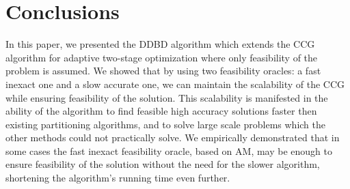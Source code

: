 \documentclass[12pt,x11names]{article}
\theoremstyle{definition}
\begin{document}
\section{Conclusions}
In this paper, we presented the DDBD algorithm which extends the CCG algorithm for adaptive two-stage optimization where only feasibility of the problem is assumed. We showed that by using two feasibility oracles: a fast inexact one and a slow accurate one, we can maintain the scalability of the CCG while ensuring feasibility of the solution. This scalability is manifested in the ability of the algorithm to find feasible high accuracy solutions faster then existing partitioning algorithms, and to solve large scale problems which the other methods could not practically solve. We empirically demonstrated that in some cases the fast inexact feasibility oracle, based on AM, may be enough to ensure feasibility of the solution without the need for the slower algorithm, shortening the algorithm's running time even further.
\end{document}
